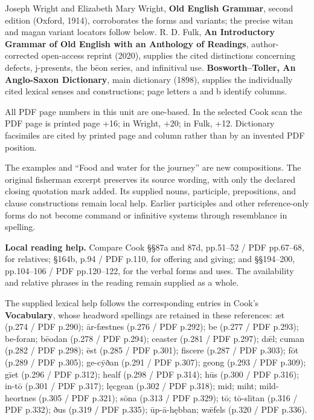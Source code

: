 Joseph Wright and Elizabeth Mary Wright, \textbf{Old English Grammar}, second edition (Oxford, 1914), corroborates the forms and variants; the precise witan and magan variant locators follow below. R. D. Fulk, \textbf{An Introductory Grammar of Old English with an Anthology of Readings}, author-corrected open-access reprint (2020), supplies the cited distinctions concerning defects, j-presents, the bēon series, and infinitival use. \textbf{Bosworth–Toller, An Anglo-Saxon Dictionary}, main dictionary (1898), supplies the individually cited lexical senses and constructions; page letters a and b identify columns.

All PDF page numbers in this unit are one-based. In the selected Cook scan the PDF page is printed page +16; in Wright, +20; in Fulk, +12. Dictionary facsimiles are cited by printed page and column rather than by an invented PDF position.

The examples and “Food and water for the journey” are new compositions. The original fisherman excerpt preserves its source wording, with only the declared closing quotation mark added. Its supplied nouns, participle, prepositions, and clause constructions remain local help. Earlier participles and other reference-only forms do not become command or infinitive systems through resemblance in spelling.

\textbf{Local reading help.} Compare Cook §§87a and 87d, pp.51–52 /\allowbreak{} PDF pp.67–68, for relatives; §164b, p.94 /\allowbreak{} PDF p.110, for offering and giving; and §§194–200, pp.104–106 /\allowbreak{} PDF pp.120–122, for the verbal forms and uses. The availability and relative phrases in the reading remain supplied as a whole.

The supplied lexical help follows the corresponding entries in Cook’s \textbf{Vocabulary}, whose headword spellings are retained in these references: æt (p.274 /\allowbreak{} PDF p.290); ār-fæstnes (p.276 /\allowbreak{} PDF p.292); be (p.277 /\allowbreak{} PDF p.293); be-foran; bēodan (p.278 /\allowbreak{} PDF p.294); ceaster (p.281 /\allowbreak{} PDF p.297); dǣl; cuman (p.282 /\allowbreak{} PDF p.298); ēst (p.285 /\allowbreak{} PDF p.301); fiscere (p.287 /\allowbreak{} PDF p.303); fōt (p.289 /\allowbreak{} PDF p.305); ge-cȳðan (p.291 /\allowbreak{} PDF p.307); geong (p.293 /\allowbreak{} PDF p.309); gīet (p.296 /\allowbreak{} PDF p.312); healf (p.298 /\allowbreak{} PDF p.314); hūs (p.300 /\allowbreak{} PDF p.316); in-tō (p.301 /\allowbreak{} PDF p.317); lęcgean (p.302 /\allowbreak{} PDF p.318); mid; miht; mild-heortnes (p.305 /\allowbreak{} PDF p.321); sōna (p.313 /\allowbreak{} PDF p.329); tō; tō-slītan (p.316 /\allowbreak{} PDF p.332); ðus (p.319 /\allowbreak{} PDF p.335); ūp-ā-hębban; wǣfels (p.320 /\allowbreak{} PDF p.336).

